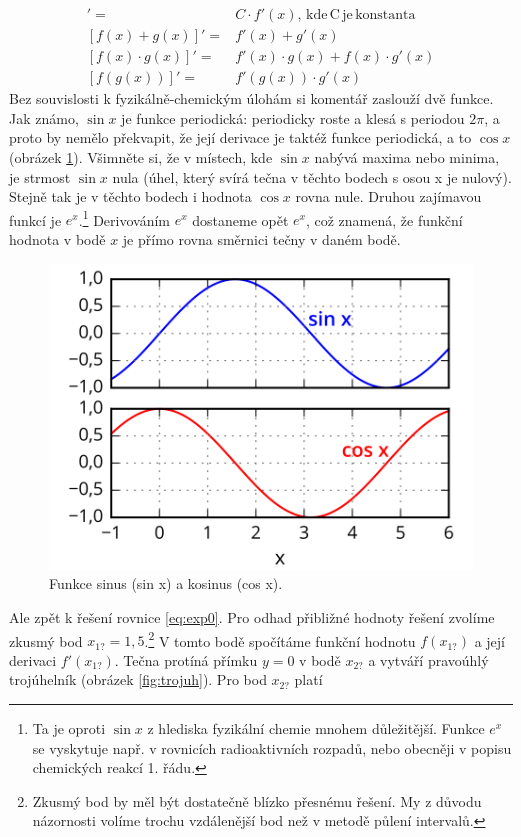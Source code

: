 \documentclass[a4paper,oneside,12pt]{article}
\begin{document}
\begin{align*}
[C \cdot f(x)]' = {} & C \cdot f'(x), \mathrm{\,kde\,C\,je\,konstanta} \\
[f(x) + g(x)]' = {} & f'(x) + g'(x) \\
[f(x) \cdot g(x)]' = {} & f'(x) \cdot g(x) + f(x) \cdot g'(x) \\
\left[ f\left(g(x)\right)\right]' = {} & f'\left(g(x)\right) \cdot g'(x)
\end{align*}
%
Bez souvislosti k fyzikálně-chemickým úlohám si komentář 
zaslouží dvě funkce. Jak známo, $\sin x$ je funkce periodická:
periodicky roste a klesá s periodou $2\pi$, a proto by 
nemělo překvapit, že její derivace je taktéž funkce 
periodická, a to $\cos x$ (obrázek \ref{fig:sincos}).
Všimněte si, že v místech, 
kde $\sin x$ nabývá maxima nebo minima, je strmost $\sin x$
nula (úhel, který svírá tečna v těchto bodech s osou x je 
nulový). Stejně tak je v těchto bodech i 
hodnota $\cos x$ rovna nule. Druhou zajímavou funkcí 
je $e^x$.\footnote{Ta je oproti $\sin x$ z hlediska fyzikální
chemie mnohem důležitější. Funkce $e^x$ se vyskytuje 
např. v rovnicích
radioaktivních rozpadů, nebo obecněji v popisu chemických
reakcí 1. řádu.} Derivováním $e^x$ dostaneme opět $e^x$, což 
znamená, že funkční hodnota v bodě $x$ je přímo rovna
směrnici tečny v daném bodě.

\begin{figure}
\begin{center}
\includegraphics{./IMGS/sincos-drawing.png}
\end{center}
\caption{Funkce sinus (sin x) a kosinus (cos x).}
\label{fig:sincos}
\end{figure}
%
Ale zpět k řešení rovnice \ref{eq:exp0}. Pro odhad 
přibližné hodnoty řešení zvolíme zkusmý bod
$x_{1?}=1,5$.\footnote{Zkusmý bod by měl být dostatečně 
blízko přesnému řešení. My z důvodu názornosti volíme 
trochu vzdálenější bod než v metodě půlení intervalů.}
V tomto bodě spočítáme funkční hodnotu $f(x_{1?})$ a její
derivaci $f'(x_{1?})$. Tečna protíná přímku $y=0$ v bodě $x_{2?}$
a vytváří pravoúhlý trojúhelník (obrázek \ref{fig:trojuh}).
Pro bod $x_{2?}$ platí
\end{document}
